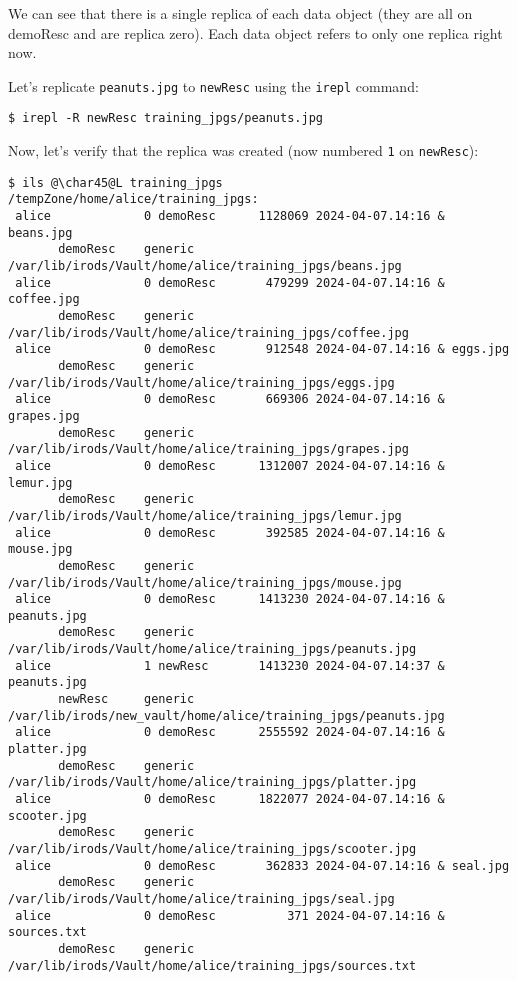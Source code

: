 \documentclass[10pt,oneside]{memoir}
\begin{document}
We can see that there is a single replica of each data object (they are all on demoResc and are replica zero). Each data object refers to only one replica right now.

Let's replicate \texttt{peanuts.jpg} to \texttt{newResc} using the \texttt{irepl} command:

\begin{lstlisting}
$ irepl -R newResc training_jpgs/peanuts.jpg
\end{lstlisting}

Now, let's verify that the replica was created (now numbered \texttt{1} on \texttt{newResc}):

\begin{lstlisting}[basicstyle=\tiny\ttfamily]
$ ils @\char45@L training_jpgs
/tempZone/home/alice/training_jpgs:
 alice             0 demoResc      1128069 2024-04-07.14:16 & beans.jpg
       demoResc    generic    /var/lib/irods/Vault/home/alice/training_jpgs/beans.jpg
 alice             0 demoResc       479299 2024-04-07.14:16 & coffee.jpg
       demoResc    generic    /var/lib/irods/Vault/home/alice/training_jpgs/coffee.jpg
 alice             0 demoResc       912548 2024-04-07.14:16 & eggs.jpg
       demoResc    generic    /var/lib/irods/Vault/home/alice/training_jpgs/eggs.jpg
 alice             0 demoResc       669306 2024-04-07.14:16 & grapes.jpg
       demoResc    generic    /var/lib/irods/Vault/home/alice/training_jpgs/grapes.jpg
 alice             0 demoResc      1312007 2024-04-07.14:16 & lemur.jpg
       demoResc    generic    /var/lib/irods/Vault/home/alice/training_jpgs/lemur.jpg
 alice             0 demoResc       392585 2024-04-07.14:16 & mouse.jpg
       demoResc    generic    /var/lib/irods/Vault/home/alice/training_jpgs/mouse.jpg
 alice             0 demoResc      1413230 2024-04-07.14:16 & peanuts.jpg
       demoResc    generic    /var/lib/irods/Vault/home/alice/training_jpgs/peanuts.jpg
 alice             1 newResc       1413230 2024-04-07.14:37 & peanuts.jpg
       newResc     generic    /var/lib/irods/new_vault/home/alice/training_jpgs/peanuts.jpg
 alice             0 demoResc      2555592 2024-04-07.14:16 & platter.jpg
       demoResc    generic    /var/lib/irods/Vault/home/alice/training_jpgs/platter.jpg
 alice             0 demoResc      1822077 2024-04-07.14:16 & scooter.jpg
       demoResc    generic    /var/lib/irods/Vault/home/alice/training_jpgs/scooter.jpg
 alice             0 demoResc       362833 2024-04-07.14:16 & seal.jpg
       demoResc    generic    /var/lib/irods/Vault/home/alice/training_jpgs/seal.jpg
 alice             0 demoResc          371 2024-04-07.14:16 & sources.txt
       demoResc    generic    /var/lib/irods/Vault/home/alice/training_jpgs/sources.txt
\end{lstlisting}
\end{document}
